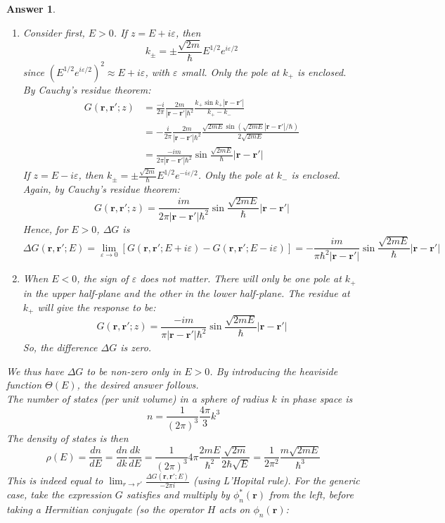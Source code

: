 \documentclass[a4paper]{article}
\newtheorem{ans}{Answer}[section]
\theoremstyle{new}
\begin{document}
\begin{ans}
\begin{enumerate}
    \item Consider first, $E>0$. If $z=E+i\varepsilon$, then 
    $$k_\pm=\pm\frac{\sqrt{2m}}{\hbar}E^{1/2}e^{i\varepsilon/2}$$
    since $(E^{1/2}e^{i\varepsilon/2})^2\approx E+i\varepsilon$, with $\varepsilon$ small. Only the pole at $k_+$ is enclosed. By Cauchy's residue theorem:
    \begin{align}
        G(\mathbf{r},\mathbf{r'};z)&=\frac{-i}{2\pi}\frac{2m}{|\mathbf{r}-\mathbf{r'}|\hbar^2}\frac{k_+\sin k_+|\mathbf{r}-\mathbf{r'}|}{k_+-k_-}\nonumber\\&=-\frac{i}{2\pi}\frac{2m}{|\mathbf{r}-\mathbf{r'}|\hbar^2}\frac{\sqrt{2mE}\sin(\sqrt{2mE}|\mathbf{r}-\mathbf{r'}|/\hbar)}{2\sqrt{2mE}}\nonumber\\&=\frac{-im}{2\pi|\mathbf{r}-\mathbf{r'}|\hbar^2}\sin\frac{\sqrt{2mE}}{\hbar}|\mathbf{r}-\mathbf{r'}|\nonumber
    \end{align}
    If $z=E-i\varepsilon$, then $k_\pm=\pm\frac{\sqrt{2m}}{\hbar}E^{1/2}e^{-i\varepsilon/2}$. Only the pole at $k_-$ is enclosed. Again, by Cauchy's residue theorem:
    $$G(\mathbf{r},\mathbf{r'};z)=\frac{im}{2\pi|\mathbf{r}-\mathbf{r'}|\hbar^2}\sin\frac{\sqrt{2mE}}{\hbar}|\mathbf{r}-\mathbf{r'}|$$
    Hence, for $E>0$, $\Delta G$ is
    $$\Delta G(\mathbf{r},\mathbf{r'};E)=\lim_{\varepsilon\rightarrow 0}[G(\mathbf{r},\mathbf{r'};E+i\varepsilon)-G(\mathbf{r},\mathbf{r'};E-i\varepsilon)]=-\frac{im}{\pi\hbar^2|\mathbf{r}-\mathbf{r'}|}\sin\frac{\sqrt{2mE}}{\hbar}|\mathbf{r}-\mathbf{r'}|$$
    \item When $E<0$, the sign of $\varepsilon$ does not matter. There will only be one pole at $k_+$ in the upper half-plane and the other in the lower half-plane. The residue at $k_+$ will give the response to be:
    $$G(\mathbf{r},\mathbf{r'};z)=\frac{-im}{\pi|\mathbf{r}-\mathbf{r'}|\hbar^2}\sin\frac{\sqrt{2mE}}{\hbar}|\mathbf{r}-\mathbf{r'}|$$
    So, the difference $\Delta G$ is zero. 
\end{enumerate}
We thus have $\Delta G$ to be non-zero only in $E>0$. By introducing the heaviside function $\Theta(E)$, the desired answer follows.\\[5pt]
The number of states (per unit volume) in a sphere of radius $k$ in phase space is
$$n=\frac{1}{(2\pi)^3}\frac{4\pi}{3}k^3$$
The density of states is then
$$\rho(E)=\frac{dn}{dE}=\frac{dn}{dk}\frac{dk}{dE}=\frac{1}{(2\pi)^3}4\pi \frac{2mE}{\hbar^2}\frac{\sqrt{2m}}{2\hbar\sqrt{E}}=\frac{1}{2\pi^2}\frac{m\sqrt{2mE}}{\hbar^3}$$
This is indeed equal to $\lim_{r\rightarrow r'}\frac{\Delta G(\mathbf{r},\mathbf{r'};E)}{-2\pi i}$ (using L'Hopital rule). For the generic case, take the expression $G$ satisfies and multiply by $\phi_n^*(\mathbf{r})$ from the left, before taking a Hermitian conjugate (so the operator $H$ acts on $\phi_n(\mathbf{r})$:

\end{ans}
\end{document}
